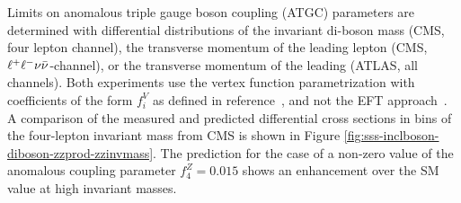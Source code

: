 \begin{table}[htp]
\begin{center}
\caption{Summary of measured $\ZZ$ production cross sections from ATLAS and CMS
at 7, 8 and 13 TeV center-of-mass energies in the four lepton and $\ll\vv$ final state.}
\label{tab:sss-ZZprod-cross-sections}
\end{center}
\label{default}
\end{table}%


Limits on anomalous triple gauge boson coupling (ATGC) parameters are determined with differential distributions of the 
invariant di-boson mass (CMS, four lepton channel), 
the transverse momentum of the leading lepton (CMS, $\ll\vv$-channel), or
the transverse momentum of the leading \Z (ATLAS, all channels).
Both experiments use the vertex function parametrization with coefficients of the form $f_i^V$ 
as defined in reference~\cite{Baur:2000cx}, and not the EFT approach~\cite{Degrande:2012wf}.
A comparison of the measured and predicted differential cross sections in bins of the 
four-lepton invariant mass from CMS is shown in Figure \ref{fig:sss-inclboson-diboson-zzprod-zzinvmass}.
The prediction for the case of a non-zero value of the anomalous coupling
parameter $f_4^Z=0.015$ shows an enhancement over the SM value at high 
invariant masses. 

